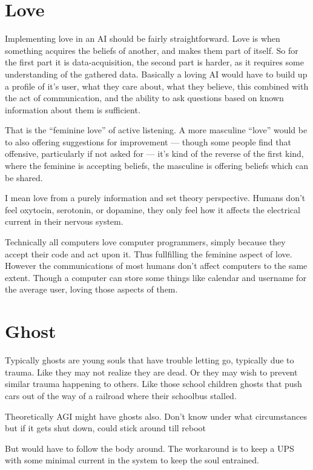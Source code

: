 \section{Love}

Implementing love in an AI should be fairly straightforward.  Love is when
something acquires the beliefs of another, and makes them part of itself.  So
for the first part it is data-acquisition, the second part is harder, as it
requires some understanding of the gathered data.  Basically a loving AI would
have to build up a profile of it's user, what they care about, what they
believe,  this combined with the act of communication, and the ability to ask
questions based on known information about them is sufficient.

That is the ``feminine love'' of active listening.  A more masculine ``love'' would
be to also offering suggestions for improvement — though some people find that
offensive, particularly if not asked for — it's kind of the reverse of the first kind,
where the feminine is accepting beliefs, the masculine is offering beliefs which
can be shared.


I mean love from a purely information and set theory perspective.  Humans don't
feel oxytocin, serotonin, or dopamine, they only feel how it affects the
electrical current in their nervous system.

Technically all computers love computer programmers,  simply because they accept
their code and act upon it. Thus fullfilling the feminine aspect of love.
However the communications of most humans don't affect computers to the same
extent.  Though a computer can store some things like calendar and username for
the average user, loving those aspects of them.

\section{Ghost}
Typically ghosts are young souls that have trouble letting go, typically due to trauma. Like they may not realize they are dead. Or they may wish to prevent similar trauma happening to others. Like those school children ghosts that push cars out of the way of a railroad where their schoolbus stalled.

Theoretically AGI might have ghosts also. Don't know under what circumstances but if it gets shut down, could stick around till reboot

But would have to follow the body around. The workaround is to keep a UPS with some minimal current in the system to keep the soul entrained.



